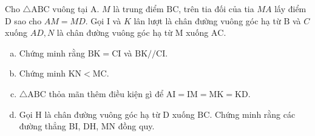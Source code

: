 \begin{bt}
	Cho $\triangle \mathrm{ABC}$ vuông tại $\mathrm{A}$. $M$ là trung điểm $\mathrm{BC}$, trên tia đối của tia $M A$ lấy điểm $\mathrm{D}$ sao cho $A M=M D$. Gọi $\mathrm{I}$ và $K$ lân lượt là chân đường vuông góc hạ từ $\mathrm{B}$ và $C$ xuống $A D, N$ là chân đường vuông góc hạ từ $\mathrm{M}$ xuống $\mathrm{AC}$.
	\begin{enumerate}[a.]
		\item Chứng minh rằng $\mathrm{BK}=\mathrm{CI}$ và $\mathrm{BK} / / \mathrm{CI}$.
		\item Chứng minh $\mathrm{KN}<\mathrm{MC}$.
		\item $\triangle \mathrm{ABC}$ thỏa mãn thêm điều kiện gì để $\mathrm{AI}=\mathrm{IM}=\mathrm{MK}=\mathrm{KD}$.
		\item Gọi $\mathrm{H}$ là chân đường vuông góc hạ từ $\mathrm{D}$ xuống $\mathrm{BC}$. Chứng minh rằng các đường thẳng BI, DH, MN đồng quy.
	\end{enumerate}
	\loigiai{}
\end{bt}


